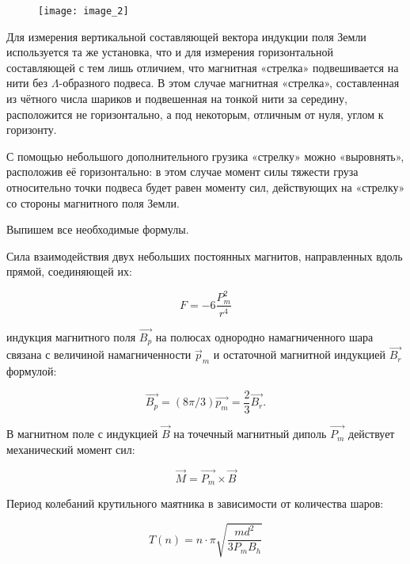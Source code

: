 \begin{figure}[h!]
	\centering
	\texttt{[image: image\_2]}
\end{figure}

Для измерения вертикальной составляющей вектора индукции поля Земли используется та же установка, что и для измерения горизонтальной составляющей с тем лишь отличием, что магнитная «стрелка» подвешивается на нити без $\Lambda$-образного подвеса. В этом случае магнитная «стрелка», составленная из чётного числа шариков и подвешенная на тонкой нити за середину, расположится не горизонтально, а под некоторым, отличным от нуля, углом к горизонту.

С помощью небольшого дополнительного грузика «стрелку» можно «выровнять», расположив её горизонтально: в этом случае момент силы тяжести груза относительно точки подвеса будет равен моменту сил, действующих на «стрелку» со стороны магнитного поля Земли.
\vspace{15mm}

Выпишем все необходимые формулы.

Сила взаимодействия двух небольших постоянных магнитов, направленных вдоль прямой, соединяющей их:

\begin{equation*}
	F = -6\frac{P_m^2}{r^4}
\end{equation*}

индукция магнитного поля $\overrightarrow{B_p}$ на полюсах однородно намагниченного шара связана с величиной намагниченности $\overrightarrow{p}_m$ и остаточной магнитной индукцией $\overrightarrow{B_r}$ формулой:

\begin{equation*}
	\overrightarrow{B_p} = (8\pi /3)\overrightarrow{p_m} = \frac{2}{3}\overrightarrow{B_r}.
\end{equation*}


В магнитном поле с индукцией $\overrightarrow{B}$ на точечный магнитный диполь $\overrightarrow{P_m}$ действует механический момент сил:

\begin{equation*}
	\overrightarrow{M} = \overrightarrow{P_m} \times \overrightarrow{B}
\end{equation*}

Период колебаний крутильного маятника в зависимости от количества шаров:

\begin{equation*}
	T(n) = n \cdot \pi\sqrt{\frac{md^2}{3P_mB_h}}
\end{equation*}


